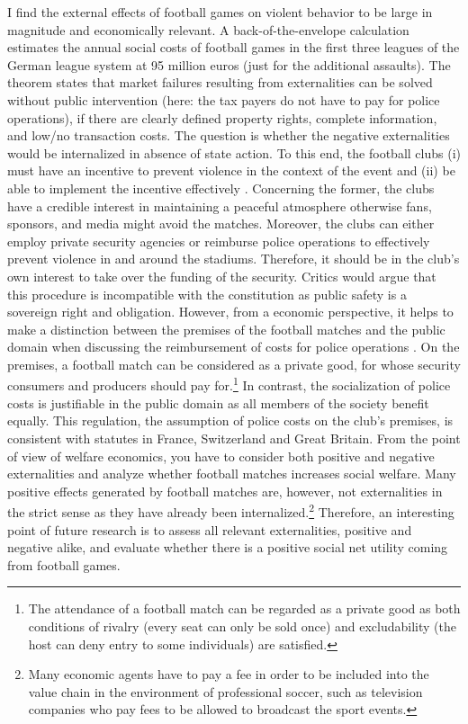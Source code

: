\documentclass[11pt, a4paper]{article} %
\begin{document}
I find the external effects of football games on violent behavior to be large in magnitude and economically relevant. A back-of-the-envelope calculation estimates the annual social costs of football games in the first three leagues of the German league system at 95 million euros (just for the additional assaults). The \cite{coase1960problem} theorem states that market failures resulting from externalities can be solved without public intervention (here: the tax payers do not have to pay for police operations), if there are clearly defined property rights, complete information, and low/no transaction costs. The question is whether the negative externalities would be internalized in absence of state action. To this end, the football clubs (i) must have an incentive to prevent violence in the context of the event and (ii) be able to implement the incentive effectively \citep{daumann2012}. Concerning the former, the clubs have a credible interest in maintaining a peaceful atmosphere otherwise fans, sponsors, and media might avoid the matches. Moreover, the clubs can either employ private security agencies or reimburse police operations to effectively prevent violence in and around the stadiums. Therefore, it should be in the club's own interest to take over the funding of the security. Critics would argue that this procedure is incompatible with the constitution as public safety is a sovereign right and obligation. However, from a economic perspective, it helps to make a distinction between the premises of the football matches and the public domain when discussing the reimbursement of costs for police operations \citep{mause2020}. On the premises, a football match can be considered as a private good, for whose security consumers and producers should pay for.\footnote{The attendance of a football match can be regarded as a private good as both conditions of rivalry (every seat can only be sold once) and excludability (the host can deny entry to some individuals) are satisfied.} In contrast, the socialization of police costs is justifiable in the public domain as all members of the society benefit equally. This regulation, the assumption of police costs on the club's premises, is consistent with statutes in France, Switzerland and Great Britain. From the point of view of welfare economics, you have to consider both positive and negative externalities and analyze whether football matches increases social welfare. Many positive effects generated by football matches are, however, not externalities in the strict sense as they have already been internalized.\footnote{Many economic agents have to pay a fee in order to be included into the value chain in the environment of professional soccer, such as television companies who pay fees to be allowed to broadcast the sport events.} Therefore, an interesting point of future research is to assess all relevant externalities, positive and negative alike, and evaluate whether there is a positive social net utility coming from football games. 
\end{document}
